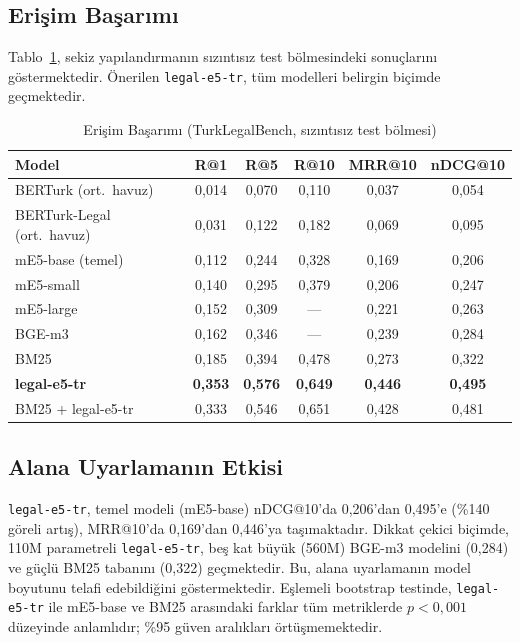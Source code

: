 \documentclass[conference]{IEEEtran}
\begin{document}
\subsection{Erişim Başarımı}
Tablo~\ref{tab:retrieval}, sekiz yapılandırmanın sızıntısız test bölmesindeki sonuçlarını göstermektedir. Önerilen \texttt{legal-e5-tr}, tüm modelleri belirgin biçimde geçmektedir.

\begin{table}[t]
\caption{Erişim Başarımı (TurkLegalBench, sızıntısız test bölmesi)}
\label{tab:retrieval}
\centering
\small
\setlength{\tabcolsep}{4pt}
\begin{tabular}{lccccc}
\toprule
Model & R@1 & R@5 & R@10 & MRR@10 & nDCG@10 \\
\midrule
BERTurk (ort.\ havuz) & 0,014 & 0,070 & 0,110 & 0,037 & 0,054 \\
BERTurk-Legal (ort.\ havuz) & 0,031 & 0,122 & 0,182 & 0,069 & 0,095 \\
mE5-base (temel) & 0,112 & 0,244 & 0,328 & 0,169 & 0,206 \\
mE5-small & 0,140 & 0,295 & 0,379 & 0,206 & 0,247 \\
mE5-large & 0,152 & 0,309 & --- & 0,221 & 0,263 \\
BGE-m3 & 0,162 & 0,346 & --- & 0,239 & 0,284 \\
BM25 & 0,185 & 0,394 & 0,478 & 0,273 & 0,322 \\
\midrule
\textbf{legal-e5-tr} & \textbf{0,353} & \textbf{0,576} & \textbf{0,649} & \textbf{0,446} & \textbf{0,495} \\
\;BM25 + legal-e5-tr & 0,333 & 0,546 & 0,651 & 0,428 & 0,481 \\
\bottomrule
\end{tabular}
\end{table}

\subsection{Alana Uyarlamanın Etkisi}
\texttt{legal-e5-tr}, temel modeli (mE5-base) nDCG@10'da 0,206'dan 0,495'e (\%140 göreli artış), MRR@10'da 0,169'dan 0,446'ya taşımaktadır. Dikkat çekici biçimde, 110M parametreli \texttt{legal-e5-tr}, beş kat büyük (560M) BGE-m3 modelini (0,284) ve güçlü BM25 tabanını (0,322) geçmektedir. Bu, alana uyarlamanın model boyutunu telafi edebildiğini göstermektedir. Eşlemeli bootstrap testinde, \texttt{legal-e5-tr} ile mE5-base ve BM25 arasındaki farklar tüm metriklerde $p<0{,}001$ düzeyinde anlamlıdır; \%95 güven aralıkları örtüşmemektedir.
\end{document}
